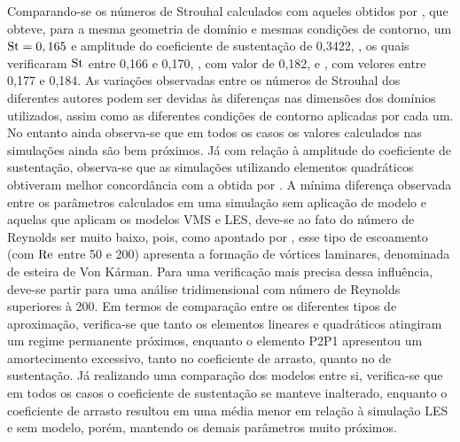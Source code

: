 Comparando-se os números de Strouhal calculados com aqueles obtidos por , que obteve, para a mesma geometria de domínio e mesmas condições de contorno, um $\mathrm{St}=0,165$ e amplitude do coeficiente de sustentação de 0,3422, , os quais verificaram $\mathrm{St}$ entre 0,166 e 0,170, , com valor de 0,182, e , com velores entre 0,177 e 0,184. As variações observadas entre os números de Strouhal dos diferentes autores podem ser devidas às diferenças nas dimensões dos domínios utilizados, assim como as diferentes condições de contorno aplicadas por cada um. No entanto ainda observa-se que em todos os casos os valores calculados nas simulações ainda são bem próximos. Já com relação à amplitude do coeficiente de sustentação, observa-se que as simulações utilizando elementos quadráticos obtiveram melhor concordância com a obtida por . A mínima diferença observada entre os parâmetros calculados em uma simulação sem aplicação de modelo e aquelas que aplicam os modelos VMS e LES, deve-se ao fato do número de Reynolds ser muito baixo, pois, como apontado por , esse tipo de escoamento (com $\mathrm{Re}$ entre 50 e 200) apresenta a formação de vórtices laminares, denominada de esteira de Von Kárman. Para uma verificação mais precisa dessa influência, deve-se partir para uma análise tridimensional com número de Reynolds superiores à 200. Em termos de comparação entre os diferentes tipos de aproximação, verifica-se que tanto os elementos lineares e quadráticos atingiram um regime permanente próximos, enquanto o elemento P2P1 apresentou um amortecimento excessivo, tanto no coeficiente de arrasto, quanto no de sustentação. Já realizando uma comparação dos modelos entre si, verifica-se que em todos os casos o coeficiente de sustentação se manteve inalterado, enquanto o coeficiente de arrasto resultou em uma média menor em relação à simulação LES e sem modelo, porém, mantendo os demais parâmetros muito próximos.

